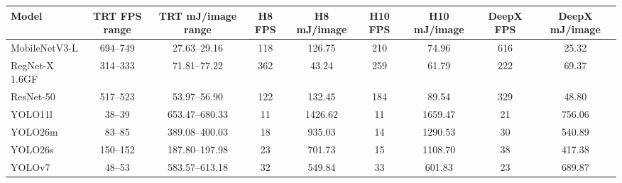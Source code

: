 \begin{tabular}{l cc S[table-format=4.0] S[table-format=4.2] S[table-format=4.0] S[table-format=4.2] S[table-format=4.0] S[table-format=4.2]}
\toprule
Model & TRT FPS range & TRT mJ/image range & {H8 FPS} & {H8 mJ/image} & {H10 FPS} & {H10 mJ/image} & {DeepX FPS} & {DeepX mJ/image} \\
\midrule
MobileNetV3-L & 694--749 & 27.63--29.16 & 118 & 126.75 & 210 & 74.96 & 616 & 25.32 \\
RegNet-X 1.6GF & 314--333 & 71.81--77.22 & 362 & 43.24 & 259 & 61.79 & 222 & 69.37 \\
ResNet-50 & 517--523 & 53.97--56.90 & 122 & 132.45 & 184 & 89.54 & 329 & 48.80 \\
YOLO11l & 38--39 & 653.47--680.33 & 11 & 1426.62 & 11 & 1659.47 & 21 & 756.06 \\
YOLO26m & 83--85 & 389.08--400.03 & 18 & 935.03 & 14 & 1290.53 & 30 & 540.89 \\
YOLO26s & 150--152 & 187.80--197.98 & 23 & 701.73 & 15 & 1108.70 & 38 & 417.38 \\
YOLOv7 & 48--53 & 583.57--613.18 & 32 & 549.84 & 33 & 601.83 & 23 & 689.87 \\
\bottomrule
\end{tabular}
